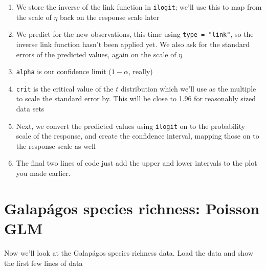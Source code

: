 \documentclass[a4paper,10pt]{article}
\begin{document}
\begin{enumerate}
\item We store the inverse of the link function in \texttt{ilogit}; we'll use this to map from the scale of $\eta$ back on the response scale later
\item We predict for the new observations, this time using \texttt{type = "link"}, so the inverse link function hasn't been applied yet. We also ask for the standard errors of the predicted values, again on the scale of $\eta$
\item \texttt{alpha} is our confidence limit ($1 - \alpha$, really)
\item \texttt{crit} is the critical value of the $t$ distribution which we'll use as the multiple to scale the standard error by. This will be close to 1.96 for reasonably sized data sets
\item Next, we convert the predicted values using \texttt{ilogit} on to the probability scale of the response, and create the confidence interval, mapping those on to the response scale as well
\item The final two lines of code just add the upper and lower intervals to the plot you made earlier.
\end{enumerate}

\begin{Schunk}
\end{Schunk}

\section{Galap\'{a}gos species richness: Poisson GLM}

Now we'll look at the Galap\'{a}gos species richness data. Load the data and show the first few lines of data
\end{document}
